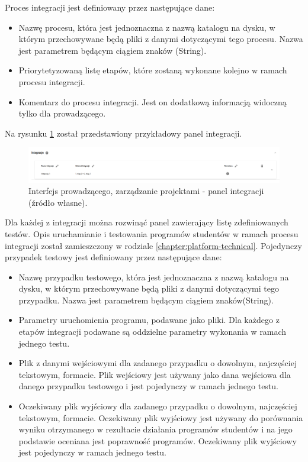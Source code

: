 Proces integracji jest definiowany przez następujące dane:
\begin {itemize}
    \item Nazwę procesu, która jest jednoznaczna z nazwą katalogu na dysku, w którym przechowywane będą pliki z danymi dotyczącymi tego procesu.
    Nazwa jest parametrem będącym ciągiem znaków (String).
    \item Priorytetyzowaną listę etapów, które zostaną wykonane kolejno w ramach procesu integracji.
    \item Komentarz do procesu integracji.
    Jest on dodatkową informacją widoczną tylko dla prowadzącego.
\end {itemize}

Na rysunku \ref{fig:lecturer_integrations} został przedstawiony przykładowy panel integracji.

\begin{figure}[h]
    \centering
    \includegraphics[width = 15cm]{chapter04/lecturer_integrations.png}
    \caption{Interfejs prowadzącego, zarządzanie projektami - panel integracji (źródło własne).}
    \label{fig:lecturer_integrations}
\end{figure}

Dla każdej z integracji można rozwinąć panel zawierający listę zdefiniowanych testów.
Opis uruchamianie i testowania programów studentów w ramach procesu integracji został zamieszczony w rodziale \ref{chapter:platform-technical}.
Pojedynczy przypadek testowy jest definiowany przez następujące dane:
\begin {itemize}
    \item Nazwę przypadku testowego, która jest jednoznaczna z nazwą katalogu na dysku, w którym przechowywane będą pliki z danymi dotyczącymi tego przypadku.
    Nazwa jest parametrem będącym ciągiem znaków(String).
    \item Parametry uruchomienia programu, podawane jako pliki.
    Dla każdego z etapów integracji podawane są oddzielne parametry wykonania w ramach jednego testu.
    \item Plik z danymi wejściowymi dla zadanego przypadku o dowolnym, najczęściej tekstowym, formacie.
    Plik wejściowy jest używany jako dana wejściowa dla danego przypadku testowego i jest pojedynczy w ramach jednego testu.
    \item Oczekiwany plik wyjściowy dla zadanego przypadku o dowolnym, najczęściej tekstowym, formacie.
    Oczekiwany plik wyjściowy jest używany do porównania wyniku otrzymanego w rezultacie działania programów studentów i na jego podstawie oceniana jest poprawność programów.
    Oczekiwany plik wyjściowy jest pojedynczy w ramach jednego testu.
\end {itemize}

